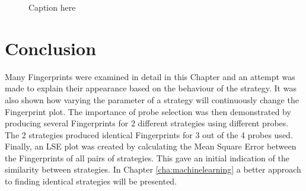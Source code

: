 \begin{figure}[htbp!]
    \caption{Caption here}
    \label{fig:mean_squares}
\end{figure}



\section{Conclusion}

Many Fingerprints were examined in detail in this Chapter and an attempt was made to explain their appearance based on the behaviour of the strategy.
It was also shown how varying the parameter of a strategy will continuously change the Fingerprint plot.
The importance of probe selection was then demonstrated by producing several Fingerprints for 2 different strategies using different probes.
The 2 strategies produced identical Fingerprints for 3 out of the 4 probes used.
Finally, an LSE plot was created by calculating the Mean Square Error between the Fingerprints of all pairs of strategies.
This gave an initial indication of the similarity between strategies.
In Chapter \ref{cha:machinelearning} a better approach to finding identical strategies will be presented.
